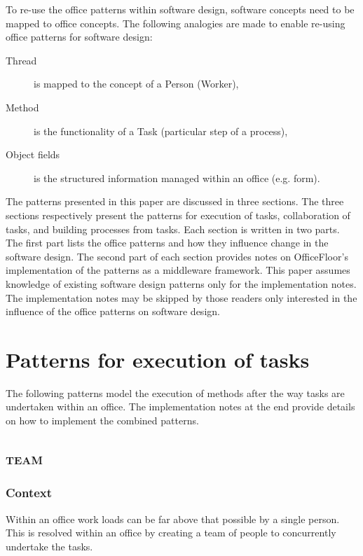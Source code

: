 \documentclass[prodmode]{style/acmlarge}
\begin{document}
To re-use the office patterns within software design, software concepts need to be
mapped to office concepts.  The following analogies are made to enable
re-using office patterns for software design:
\begin{description}
  \item[Thread] is mapped to the concept of a Person (Worker),
  \item[Method] is the functionality of a Task (particular step of a process),
  \item[Object fields] is the structured information managed within an office (e.g. form).
\end{description}

The patterns presented in this paper are discussed in three sections.  The three
sections respectively present the patterns for execution of tasks, collaboration
of tasks, and building processes from tasks.  Each section is written in two
parts.  The first part lists the office patterns and how they influence change
in the software design.  The second part of each section provides notes on
OfficeFloor's implementation of the patterns as a middleware framework.  This
paper assumes knowledge of existing software design patterns only for the
implementation notes.  The implementation notes may be skipped by those readers
only interested in the influence of the office patterns on software design.



\section{Patterns for execution of tasks}

The following patterns model the execution of methods after the way tasks are
undertaken within an office.  The implementation notes at the end provide
details on how to implement the combined patterns.


\subsection{\textsc{\textbf{team}}}

\subsubsection*{Context} Within an office work loads can be far above that
possible by a single person. This is resolved within an office by creating a
team of people to concurrently undertake the tasks.
\end{document}
